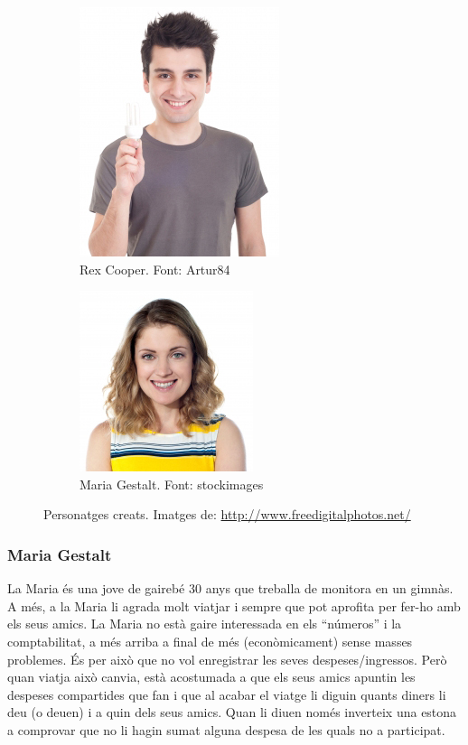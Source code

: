 \begin{figure}
	\centering
	\begin{subfigure}[b]{0.5\textwidth}
		\centering
		\includegraphics[scale=0.4]{Rex_cooper.jpg}
		\caption{Rex Cooper. Font: Artur84}
		\label{fig:rex_cooper}
	\end{subfigure}
	\quad
	\begin{subfigure}[b]{0.5\textwidth}
		\centering
		\includegraphics[scale=0.5]{Maria_gestalt.jpg}
		\caption{Maria Gestalt. Font: stockimages}
		\label{fig:maria_gestalt}
	\end{subfigure}

\caption{Personatges creats. Imatges de: \url{http://www.freedigitalphotos.net/}}\label{fig:personas}
\end{figure}


\subsubsection{Maria Gestalt}

La Maria és una jove de gairebé 30 anys que treballa de monitora en un gimnàs. A més, a la Maria li agrada molt viatjar i sempre que pot aprofita per fer-ho amb els seus amics.
La Maria no està gaire interessada en els “números” i la comptabilitat, a més arriba a final de més (econòmicament) sense masses problemes. És per això que no vol enregistrar les seves despeses/ingressos. Però quan viatja això canvia, està acostumada a que els seus amics apuntin les despeses compartides que fan i que al acabar el viatge li diguin quants diners li deu (o deuen) i a quin dels seus amics. Quan li diuen només inverteix una estona a comprovar que no li hagin sumat alguna despesa de les quals no a participat. 

